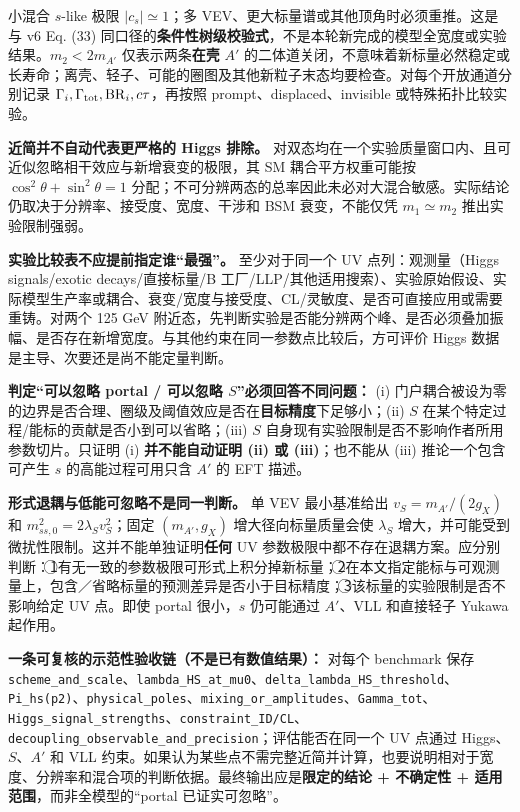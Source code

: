 \documentclass[
  chinese,
  UTF8]{ctexart}
\begin{document}
小混合 \(s\)-like 极限 \(|c_s|\simeq1\)；多
VEV、更大标量谱或其他顶角时必须重推。这是与 v6 Eq. (33)
同口径的\textbf{条件性树级校验式}，不是本轮新完成的模型全宽度或实验结果。\(m_2<2m_{A'}\)
仅表示两条\textbf{在壳} \(A'\)
的二体道关闭，不意味着新标量必然稳定或长寿命；离壳、轻子、可能的圈图及其他新粒子末态均要检查。对每个开放通道分别记录
\(\Gamma_i,\Gamma_{\rm tot},\mathrm{BR}_i,c\tau\)，再按照
prompt、displaced、invisible 或特殊拓扑比较实验。

\textbf{近简并不自动代表更严格的 Higgs 排除。}
对双态均在一个实验质量窗口内、且可近似忽略相干效应与新增衰变的极限，其
SM 耦合平方权重可能按 \(\cos^2\theta+\sin^2\theta=1\)
分配；不可分辨两态的总率因此未必对大混合敏感。实际结论仍取决于分辨率、接受度、宽度、干涉和
BSM 衰变，不能仅凭 \(m_1\simeq m_2\) 推出实验限制强弱。

\textbf{实验比较表不应提前指定谁``最强''。} 至少对于同一个 UV
点列：观测量（Higgs signals/exotic decays/直接标量/B
工厂/LLP/其他适用搜索）、实验原始假设、实际模型生产率或耦合、衰变/宽度与接受度、CL/灵敏度、是否可直接应用或需要重铸。对两个
125 GeV
附近态，先判断实验是否能分辨两个峰、是否必须叠加振幅、是否存在新增宽度。与其他约束在同一参数点比较后，方可评价
Higgs 数据是主导、次要还是尚不能定量判断。

\textbf{判定``可以忽略 portal / 可以忽略 \(S\)''必须回答不同问题：} (i)
门户耦合被设为零的边界是否合理、圈级及阈值效应是否在\textbf{目标精度}下足够小；(ii)
\(S\) 在某个特定过程/能标的贡献是否小到可以省略；(iii) \(S\)
自身现有实验限制是否不影响作者所用参数切片。只证明 (i)
\textbf{并不能自动证明 (ii) 或 (iii)}；也不能从 (iii) 推论一个包含可产生
\(s\) 的高能过程可用只含 \(A'\) 的 EFT 描述。

\textbf{形式退耦与低能可忽略不是同一判断。} 单 VEV 最小基准给出
\(v_S=m_{A'}/(2g_X)\) 和 \(m_{ss,0}^2=2\lambda_Sv_S^2\)；固定
\((m_{A'},g_X)\) 增大径向标量质量会使 \(\lambda_S\)
增大，并可能受到微扰性限制。这并不能单独证明\textbf{任何} UV
参数极限中都不存在退耦方案。应分别判断：\textcircled{1}有无一致的参数极限可形式上积分掉新标量；\textcircled{2}在本文指定能标与可观测量上，包含／省略标量的预测差异是否小于目标精度；\textcircled{3}该标量的实验限制是否不影响给定
UV 点。即使 portal 很小，\(s\) 仍可能通过 \(A'\)、VLL 和直接轻子 Yukawa
起作用。

\textbf{一条可复核的示范性验收链（不是已有数值结果）：} 对每个 benchmark
保存
\texttt{scheme\_and\_scale}、\texttt{lambda\_HS\_at\_mu0}、\texttt{delta\_lambda\_HS\_threshold}、\texttt{Pi\_hs(p2)}、\texttt{physical\_poles}、\texttt{mixing\_or\_amplitudes}、\texttt{Gamma\_tot}、\texttt{Higgs\_signal\_strengths}、\texttt{constraint\_ID/CL}、\texttt{decoupling\_observable\_and\_precision}；评估能否在同一个
UV 点通过 Higgs、\(S\)、\(A'\) 和 VLL
约束。如果认为某些点不需完整近简并计算，也要说明相对于宽度、分辨率和混合项的判断依据。最终输出应是\textbf{限定的结论
+ 不确定性 + 适用范围}，而非全模型的``portal 已证实可忽略''。
\end{document}
